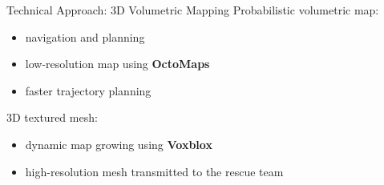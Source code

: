 \documentclass[10pt]{beamer}
\begin{document}
    \begin{frame}{Technical Approach: 3D Volumetric Mapping}
        Probabilistic volumetric map:
        \begin{itemize}
            \item navigation and planning
            \item low-resolution map using \textbf{OctoMaps}
            \item faster trajectory planning
        \end{itemize}

        3D textured mesh:
        \begin{itemize}
            \item dynamic map growing using \textbf{Voxblox}
            \item high-resolution mesh transmitted to the rescue team
        \end{itemize}
    \end{frame}
\end{document}
